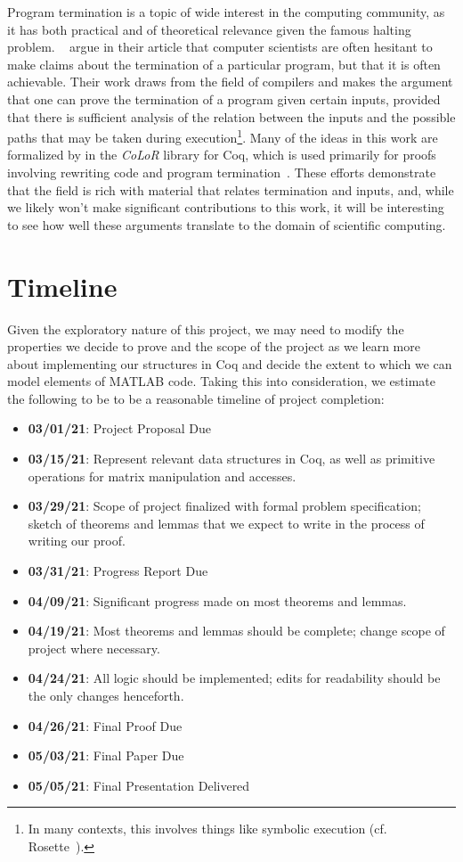 \documentclass[11pt,conference]{IEEEtran}
\begin{document}
Program termination is a topic of wide interest in the computing community, as
it has both practical and of theoretical relevance given the famous halting
problem. \citeauthor{Cook_2011}~\cite{Cook_2011} argue in their article that
computer scientists are often hesitant to make claims about the termination of a
particular program, but that it is often achievable. Their work draws from the
field of compilers and makes the argument that one can prove the termination of
a program given certain inputs, provided that there is sufficient analysis of
the relation between the inputs and the possible paths that may be taken during
execution\footnote{In many contexts, this involves things like symbolic
execution (cf. Rosette~\cite{Rosette}).}. Many of the ideas in this work are
formalized by \citeauthor{BLANQUI_2011} in the \textit{CoLoR} library for Coq,
which is used primarily for proofs involving rewriting code and program
termination~\cite{BLANQUI_2011}. These efforts demonstrate that the field is
rich with material that relates termination and inputs, and, while we likely
won't make significant contributions to this work, it will be interesting to see
how well these arguments translate to the domain of scientific computing.

\section{Timeline}

Given the exploratory nature of this project, we may need to modify the
properties we decide to prove and the scope of the project as we learn more
about implementing our structures in Coq and decide the extent to which we can
model elements of MATLAB code. Taking this into consideration, we estimate the
following to be to be a reasonable timeline of project completion:

\begin{itemize}
    \item \textbf{03/01/21}: Project Proposal Due
    \item \textbf{03/15/21}: Represent relevant data structures in Coq, as well
        as primitive operations for matrix manipulation and accesses.
    \item \textbf{03/29/21}: Scope of project finalized with formal problem
        specification; sketch of theorems and lemmas that we expect to write in
        the process of writing our proof.
    \item \textbf{03/31/21}: Progress Report Due
    \item \textbf{04/09/21}: Significant progress made on most theorems and
        lemmas.
    \item \textbf{04/19/21}: Most theorems and lemmas should be complete; change
        scope of project where necessary.
    \item \textbf{04/24/21}: All logic should be implemented; edits for readability should be the only changes henceforth.
    \item \textbf{04/26/21}: Final Proof Due
    \item \textbf{05/03/21}: Final Paper Due
    \item \textbf{05/05/21}: Final Presentation Delivered
\end{itemize}
\end{document}
